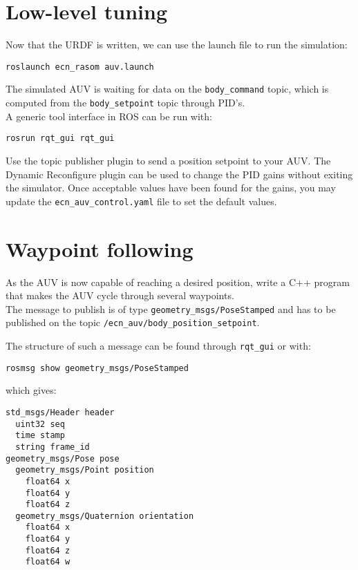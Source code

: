 \documentclass{ecnreport}
\begin{document}
\section{Low-level tuning}

Now that the URDF is written, we can use the launch file to run the simulation:
\begin{center}
\begin{lstlisting}
roslaunch ecn_rasom auv.launch
\end{lstlisting}
\end{center}
The simulated AUV is waiting for data on the \texttt{body\_command} topic, which is computed from the \texttt{body\_setpoint} topic through PID's.\\
A generic tool interface in ROS can be run with:
\begin{center}
\begin{lstlisting}
rosrun rqt_gui rqt_gui
\end{lstlisting}
\end{center}
Use the topic publisher plugin to send a position setpoint to your AUV. The Dynamic Reconfigure plugin can be used to change the PID gains without exiting the simulator.
Once acceptable values have been found for the gains, you may update the \texttt{ecn\_auv\_control.yaml} file to set the default values.

\section{Waypoint following}


As the AUV is now capable of reaching a desired position, write a C++ program that makes the AUV cycle through several waypoints. \\
The message to publish is of type \texttt{geometry\_msgs/PoseStamped} and has to be published on the topic \texttt{/ecn\_auv/body\_position\_setpoint}.

The structure of such a message can be found through \texttt{rqt\_gui} or with:
\begin{center}
\begin{lstlisting}
rosmsg show geometry_msgs/PoseStamped
\end{lstlisting}
\end{center}
which gives:
\begin{center}
\begin{lstlisting}
std_msgs/Header header
  uint32 seq
  time stamp
  string frame_id
geometry_msgs/Pose pose
  geometry_msgs/Point position
    float64 x
    float64 y
    float64 z
  geometry_msgs/Quaternion orientation
    float64 x
    float64 y
    float64 z
    float64 w

\end{lstlisting}
\end{center}
\end{document}
